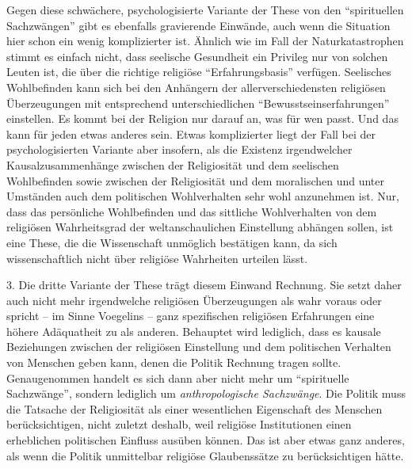 Gegen diese schwächere, psychologisierte Variante der These von den
"`spirituellen Sachzwängen"' gibt es ebenfalls gravierende Einwände, auch wenn
die Situation hier schon ein wenig komplizierter ist. Ähnlich wie im Fall der
Naturkatastrophen stimmt es einfach nicht, dass seelische Gesundheit ein
Privileg nur von solchen Leuten ist, die über die richtige religiöse
"`Erfahrungsbasis"' verfügen. Seelisches Wohlbefinden kann sich bei den
Anhängern der allerverschiedensten religiösen Überzeugungen mit entsprechend
unterschiedlichen "`Bewusstseinserfahrungen"' einstellen. Es kommt bei der
Religion nur darauf an, was für wen passt. Und das kann für jeden etwas
anderes sein. Etwas komplizierter liegt der Fall bei der psychologisierten
Variante aber insofern, als die Existenz irgendwelcher Kausalzusammenhänge
zwischen der Religiosität und dem seelischen Wohlbefinden sowie zwischen der
Religiosität und dem moralischen und unter Umständen auch dem politischen
Wohlverhalten sehr wohl anzunehmen ist. Nur, dass das persönliche Wohlbefinden
und das sittliche Wohlverhalten von dem religiösen Wahrheitsgrad der
weltanschaulichen Einstellung abhängen sollen, ist eine These, die die
Wissenschaft unmöglich bestätigen kann, da sich wissenschaftlich nicht über
religiöse Wahrheiten urteilen lässt.
 
3. Die dritte Variante der These trägt diesem Einwand Rechnung. Sie setzt
daher auch nicht mehr irgendwelche religiösen Überzeugungen als wahr voraus
oder spricht -- im Sinne Voegelins -- ganz spezifischen religiösen Erfahrungen
eine höhere Adäquatheit zu als anderen. Behauptet wird lediglich, dass es
kausale Beziehungen zwischen der religiösen Einstellung und dem politischen
Verhalten von Menschen geben kann, denen die Politik Rechnung tragen sollte.
Genaugenommen handelt es sich dann aber nicht mehr um "`spirituelle
Sachzwänge"', sondern lediglich um {\em anthropologische Sachzwänge}. Die
Politik muss die Tatsache der Religiosität als einer wesentlichen Eigenschaft
des Menschen berücksichtigen, nicht zuletzt deshalb, weil religiöse
Institutionen einen erheblichen politischen Einfluss ausüben können. Das ist
aber etwas ganz anderes, als wenn die Politik unmittelbar religiöse
Glaubenssätze zu berücksichtigen hätte.

